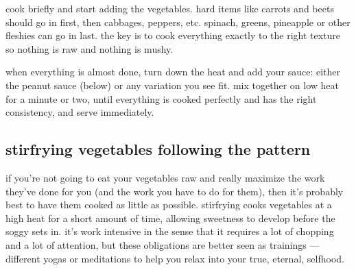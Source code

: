 cook briefly and start adding the vegetables. hard items like carrots and 
beets should go in first, then cabbages, peppers, etc. spinach, greens, 
pineapple or other fleshies can go in last. the key is to cook everything 
exactly to the right texture so nothing is raw and nothing is mushy.

when everything is almost done, turn down the heat and add your sauce: 
either the peanut sauce (below) or any variation you see fit. mix together 
on low heat for a minute or two, until everything is cooked perfectly and has 
the right consistency, and serve immediately.

\subsection{stirfrying vegetables following the pattern}

if you're not going to eat your vegetables raw and really maximize the work 
they've done for you (and the work you have to do for them), then it's 
probably best to have them cooked as little as possible. stirfrying cooks 
vegetables at a high heat for a short amount of time, allowing sweetness to 
develop before the soggy sets in. it's work intensive in the sense that it 
requires a lot of chopping and a lot of attention, but these obligations are 
better seen as trainings --- different yogas or meditations to help you relax 
into your true, eternal, selfhood.

